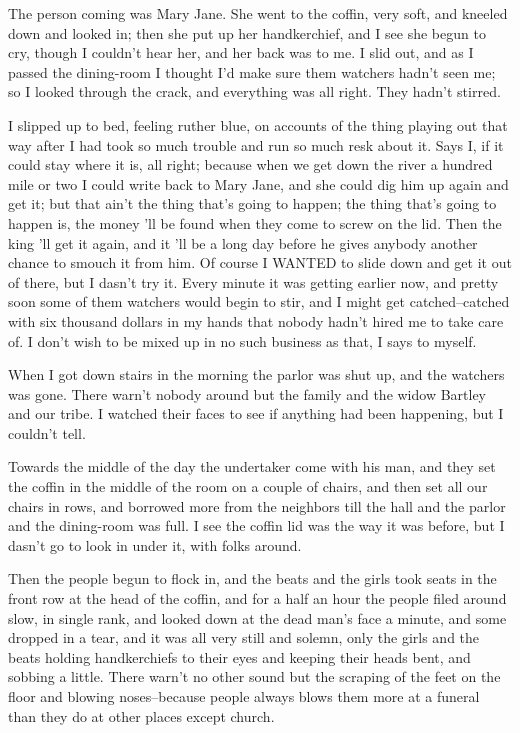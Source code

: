 The person coming was Mary Jane.  She went to the coffin, very soft, and
kneeled down and looked in; then she put up her handkerchief, and I see
she begun to cry, though I couldn't hear her, and her back was to me.  I
slid out, and as I passed the dining-room I thought I'd make sure them
watchers hadn't seen me; so I looked through the crack, and everything
was all right.  They hadn't stirred.

I slipped up to bed, feeling ruther blue, on accounts of the thing
playing out that way after I had took so much trouble and run so much
resk about it.  Says I, if it could stay where it is, all right; because
when we get down the river a hundred mile or two I could write back to
Mary Jane, and she could dig him up again and get it; but that ain't the
thing that's going to happen; the thing that's going to happen is, the
money 'll be found when they come to screw on the lid.  Then the king 'll
get it again, and it 'll be a long day before he gives anybody another
chance to smouch it from him. Of course I WANTED to slide down and get it
out of there, but I dasn't try it.  Every minute it was getting earlier
now, and pretty soon some of them watchers would begin to stir, and I
might get catched--catched with six thousand dollars in my hands that
nobody hadn't hired me to take care of.  I don't wish to be mixed up in
no such business as that, I says to myself.

When I got down stairs in the morning the parlor was shut up, and the
watchers was gone.  There warn't nobody around but the family and the
widow Bartley and our tribe.  I watched their faces to see if anything
had been happening, but I couldn't tell.

Towards the middle of the day the undertaker come with his man, and they
set the coffin in the middle of the room on a couple of chairs, and then
set all our chairs in rows, and borrowed more from the neighbors till the
hall and the parlor and the dining-room was full.  I see the coffin lid
was the way it was before, but I dasn't go to look in under it, with
folks around.

Then the people begun to flock in, and the beats and the girls took seats
in the front row at the head of the coffin, and for a half an hour the
people filed around slow, in single rank, and looked down at the dead
man's face a minute, and some dropped in a tear, and it was all very
still and solemn, only the girls and the beats holding handkerchiefs to
their eyes and keeping their heads bent, and sobbing a little.  There
warn't no other sound but the scraping of the feet on the floor and
blowing noses--because people always blows them more at a funeral than
they do at other places except church.


